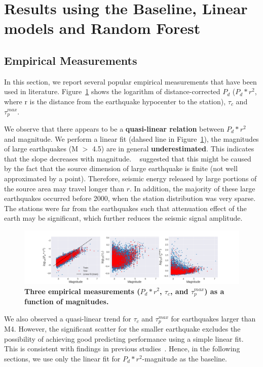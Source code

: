 \documentclass{article} %
\begin{document}
\section{Results using the Baseline, Linear models and Random Forest}

\subsection{Empirical Measurements}
In this section, we report several popular empirical measurements that have been used in literature. Figure~\ref{empirical_measurements} shows the logarithm of distance-corrected $P_d$ ($P_d * r^2$, where r is the distance from the earthquake hypocenter to the station), $\tau_c$ and $\tau_p^{max}$. 

We observe that there appears to be a \textbf{quasi-linear relation} between $P_d * r^2$ and magnitude. We perform a linear fit (dahsed line in Figure~\ref{empirical_measurements}), the magnitudes of large earthquakes (M $>$ 4.5) are in general \textbf{underestimated}. This indicates that the slope decreases with magnitude. ~\cite{Wurman2007} suggested that this might be caused by the fact that the source dimension of large earthquake is finite (not well approximated by a point). Therefore, seismic energy released by large portions of the source area may travel longer than $r$. In addition, the majority of these large earthquakes occurred before 2000, when the station distribution was very sparse. The stations were far from the earthquakes such that attenuation effect of the earth may be significant, which further reduces the seismic signal amplitude.     

\begin{figure}[ht!]
	\centering
	\includegraphics*[scale=0.33, viewport= 40mm 0mm 500mm 120mm, angle=0]{./figure/empirical_measurements.png}
	\caption{{\bf Three empirical measurements ($P_d * r^2$, $\tau_c$, and $\tau_p^{max}$) as a function of magnitudes.}}\label{empirical_measurements} 
\end{figure}

We also observed a quasi-linear trend for $\tau_c$ and $\tau_p^{max}$ for earthquakes larger than M4. However, the significant scatter for the smaller earthquake excludes the possibility of achieving good predicting performance using a simple linear fit. This is consistent with findings in previous studies~\cite{Wurman2007}. Hence, in the following sections, we use only the linear fit for $P_d * r^2$-magnitude as the baseline.  
\end{document}
